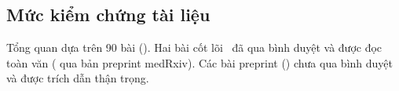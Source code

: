 \subsection{Mức kiểm chứng tài liệu}

Tổng quan dựa trên 90 bài (). Hai bài cốt
lõi~\cite{khovanova2026comparative,nishio2026zeroshot} đã qua bình duyệt và được đọc toàn văn
(\cite{nishio2026zeroshot} qua bản preprint medRxiv). Các bài preprint
(\cite{muthyala2026frozen,choi2026chexpercept,fisher2025vlfm,mustafic2026noduloc}) chưa qua bình duyệt và được
trích dẫn thận trọng.

